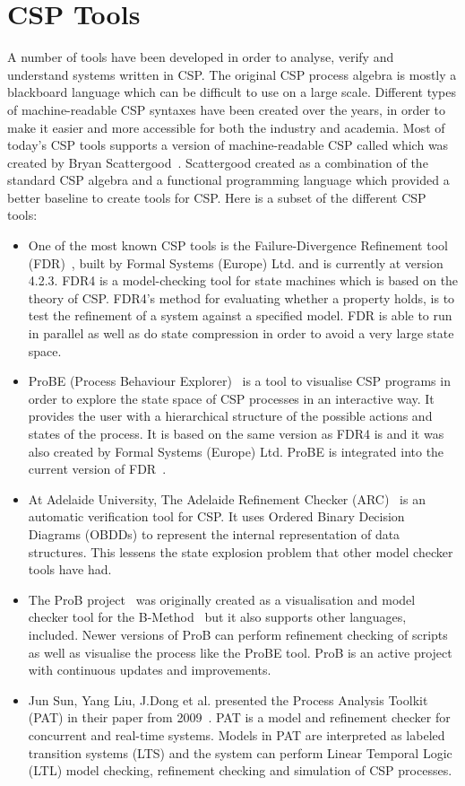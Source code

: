 \section{CSP Tools}
A number of tools have been developed in order to analyse, verify and understand systems written in CSP. The original CSP process algebra is mostly a blackboard language which can be difficult to use on a large scale. Different types of machine-readable CSP syntaxes have been created over the years, in order to make it easier and more accessible for both the industry and academia. Most of today's CSP tools supports a version of machine-readable CSP called \cspm{} which was created by Bryan Scattergood~\cite{Scattergood1998}. Scattergood created \cspm{} as a combination of the standard CSP algebra and a functional programming language which provided a better baseline to create tools for CSP.
Here is a subset of the different CSP tools:
\begin{itemize}
\item One of the most known CSP tools is the Failure-Divergence Refinement tool (FDR)~\cite{fdr}, built by Formal Systems (Europe) Ltd. and is currently at version 4.2.3. FDR4 is a model-checking tool for state machines which is based on the theory of CSP. FDR4's method for evaluating whether a property holds, is to test the refinement of a system against a specified model.
FDR is able to run in parallel as well as do state compression in order to avoid a very large state space.
\item ProBE (Process Behaviour Explorer)~\cite{probe} is a tool to visualise CSP programs in order to explore the state space of CSP processes in an interactive way. It provides the user with a hierarchical structure of the possible actions and states of the process. It is based on the same \cspm{} version as FDR4 is and it was also created by Formal Systems (Europe) Ltd. ProBE is integrated into the current version of FDR~\cite{fdr}.
\item At Adelaide University, The Adelaide Refinement Checker (ARC)~\cite{Parashkevov1996} is an automatic verification tool for CSP. It uses Ordered Binary Decision Diagrams (OBDDs) to represent the internal representation of data structures. This lessens the state explosion problem that other model checker tools have had.
\item The ProB project~\cite{ProB, Leuschel2003} was originally created as a visualisation and model checker tool for the B-Method~\cite{abrial2005b} but it also supports other languages, \cspm{} included. Newer versions of ProB can perform refinement checking of \cspm{} scripts as well as visualise the process like the ProBE tool. ProB is an active project with continuous updates and improvements.
\item Jun Sun, Yang Liu, J.Dong et al. presented the Process Analysis Toolkit (PAT) in their paper from 2009~\cite{Sun2009}. PAT is a model and refinement checker for concurrent and real-time systems. Models in PAT are interpreted as labeled transition systems (LTS) and the system can perform Linear Temporal Logic (LTL) model checking, refinement checking and simulation of CSP processes.
\end{itemize}

